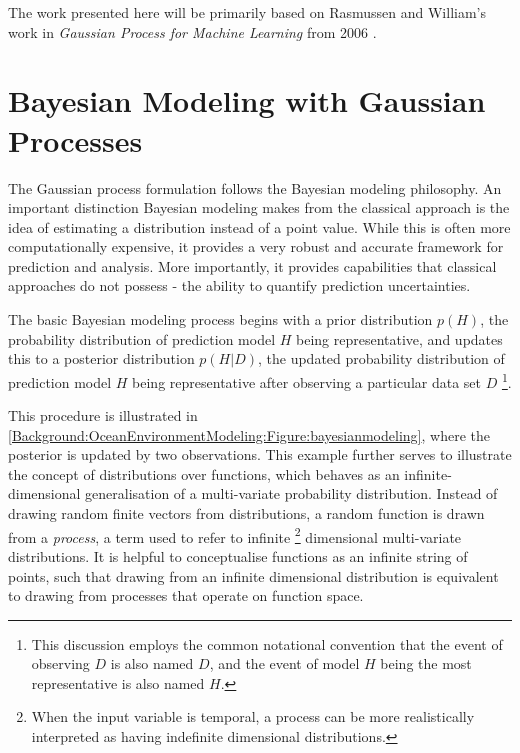 	The work presented here will be primarily based on Rasmussen and William's work in \textit{Gaussian Process for Machine Learning} from 2006 \cite{GaussianProcessForMachineLearning}. 

	\section{Bayesian Modeling with Gaussian Processes}
	\label{Background:GaussianProcesses:BayesianModeling}
	
		The Gaussian process formulation follows the Bayesian modeling philosophy. An important distinction Bayesian modeling makes from the classical approach is the idea of estimating a distribution instead of a point value. While this is often more computationally expensive, it provides a very robust and accurate framework for prediction and analysis. More importantly, it provides capabilities that classical approaches do not possess - the ability to quantify prediction uncertainties. 
		
		The basic Bayesian modeling process begins with a prior distribution $p(H)$, the probability distribution of prediction model $H$ being representative, and updates this to a posterior distribution $p(H | D)$, the updated probability distribution of prediction model $H$ being representative after observing a particular data set $D$ \footnote{This discussion employs the common notational convention that the event of observing $D$ is also named $D$, and the event of model $H$ being the most representative is also named $H$.}. 
		
		This procedure is illustrated in \cref{Background:OceanEnvironmentModeling:Figure:bayesianmodeling}, where the posterior is updated by two observations. This example further serves to illustrate the concept of distributions over functions, which behaves as an infinite-dimensional generalisation of a multi-variate probability distribution. Instead of drawing random finite vectors from distributions, a random function is drawn from a \textit{process}, a term used to refer to infinite \footnote{When the input variable is temporal, a process can be more realistically interpreted as having indefinite dimensional distributions.} dimensional multi-variate distributions. It is helpful to conceptualise functions as an infinite string of points, such that drawing from an infinite dimensional distribution is equivalent to drawing from processes that operate on function space.
		
